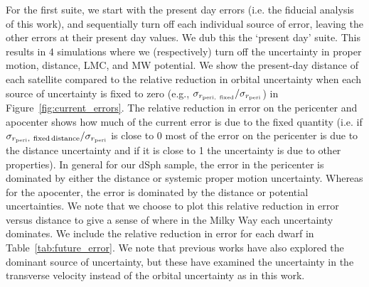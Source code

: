 \documentclass[twocolumn]{aastex63}
\begin{document}
For the first suite, we start with the present day errors (i.e. the fiducial analysis of this work), and sequentially turn off each individual source of error, leaving the other errors at their present day values. We dub this the `present day' suite. This results in 4 simulations where we (respectively) turn off the uncertainty in proper motion, distance, LMC, and MW potential. We show the present-day distance of each satellite compared to the relative reduction in orbital uncertainty when each source of uncertainty is fixed to zero (e.g., $\sigma_{r_{\rm peri,~fixed}}/\sigma_{r_{\rm peri}}$) in Figure~\ref{fig:current_errors}. The relative reduction in error on the pericenter and apocenter shows how much of the current error is due to the fixed quantity (i.e. if $\sigma_{r_{\rm peri},~{\rm fixed\,distance}}/\sigma_{r_{\rm peri}}$ is close to 0 most of the error on the pericenter is due to the distance uncertainty and if it is close to 1 the uncertainty is due to other properties). 
In general for our dSph sample, the error in the pericenter is dominated by either the distance or systemic proper motion uncertainty. Whereas for the apocenter, the error is dominated by the distance or potential uncertainties. We note that we choose to plot this relative reduction in error versus distance to give a sense of where in the Milky Way each uncertainty dominates.
We include the relative reduction in error for each dwarf in Table~\ref{tab:future_error}. We note that previous works have also explored the dominant source of uncertainty, but these have examined the uncertainty in the transverse velocity \citep{Battaglia2022A&A...657A..54B} instead of the orbital uncertainty as in this work. 
\end{document}
